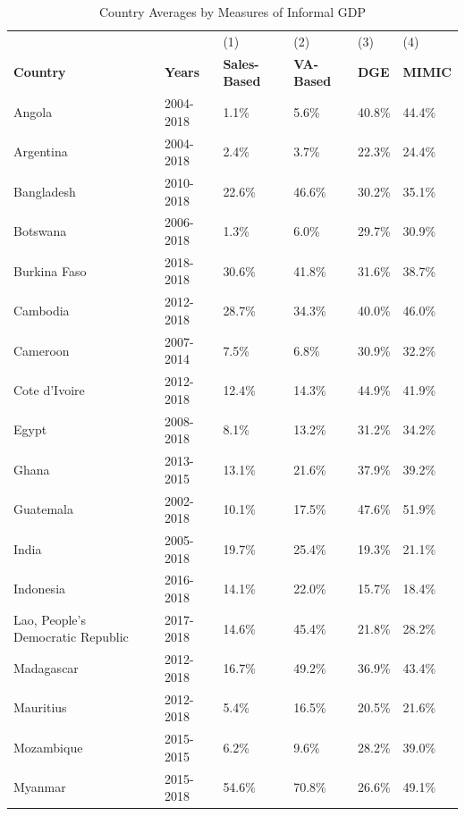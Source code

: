 \documentclass[letterpaper, 12pt]{article}
\begin{document}
       \begin{table}[ht]
        \footnotesize
        \centering
                \caption{Country Averages by Measures of Informal GDP}\label{tab_comp}
        \begin{tabular}{l l | p{2cm} p{2cm} | p{2cm} p{2cm}}
        \hline
        \hline
        &  & (1) & (2) & (3) & (4) \\
        \textbf{Country} & \textbf{Years} & \textbf{Sales-Based} & \textbf{VA-Based} & \textbf{DGE} & \textbf{MIMIC} \\
        \hline
        \hline
        Angola & 2004-2018 & 1.1\% & 5.6\% & 40.8\% & 44.4\% \\
        Argentina & 2004-2018 & 2.4\% & 3.7\% & 22.3\% & 24.4\% \\
        Bangladesh & 2010-2018 & 22.6\% & 46.6\% & 30.2\% & 35.1\% \\
        Botswana & 2006-2018 & 1.3\% & 6.0\% & 29.7\% & 30.9\% \\
        Burkina Faso & 2018-2018 & 30.6\% & 41.8\% & 31.6\% & 38.7\% \\
        Cambodia & 2012-2018 & 28.7\% & 34.3\% & 40.0\% & 46.0\% \\
        Cameroon & 2007-2014 & 7.5\% & 6.8\% & 30.9\% & 32.2\% \\
        Cote d'Ivoire & 2012-2018 & 12.4\% & 14.3\% & 44.9\% & 41.9\% \\
        Egypt & 2008-2018 & 8.1\% & 13.2\% & 31.2\% & 34.2\% \\
        Ghana & 2013-2015 & 13.1\% & 21.6\% & 37.9\% & 39.2\% \\
        Guatemala & 2002-2018 & 10.1\% & 17.5\% & 47.6\% & 51.9\% \\
        India & 2005-2018 & 19.7\% & 25.4\% & 19.3\% & 21.1\% \\
        Indonesia & 2016-2018 & 14.1\% & 22.0\% & 15.7\% & 18.4\% \\
        Lao, People's Democratic Republic & 2017-2018 & 14.6\% & 45.4\% & 21.8\% & 28.2\% \\
        Madagascar & 2012-2018 & 16.7\% & 49.2\% & 36.9\% & 43.4\% \\
        Mauritius & 2012-2018 & 5.4\% & 16.5\% & 20.5\% & 21.6\% \\
        Mozambique & 2015-2015 & 6.2\% & 9.6\% & 28.2\% & 39.0\% \\
        Myanmar & 2015-2018 & 54.6\% & 70.8\% & 26.6\% & 49.1\% \\

\end{tabular}
\end{table}
\end{document}
